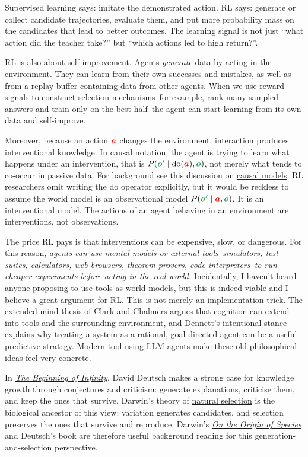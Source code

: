 \documentclass{article}
\newcommand{\colsym}[2]{\ensuremath{\textcolor{#1}{\boldsymbol{#2}}}}
\newcommand{\action}{\colsym{red}{a}}
\newcommand{\obs}{\colsym{ForestGreen}{o}}
\newcommand{\nextobs}{\colsym{ForestGreen}{o'}}
\begin{document}
Supervised learning says: imitate the demonstrated action. RL says: generate or collect candidate trajectories, evaluate them, and put more probability mass on the candidates that lead to better outcomes. 
The learning signal is not just ``what action did the teacher take?'' but ``which actions led to high return?''. 

RL is also about self-improvement. Agents \emph{generate} data by acting in the environment. They can learn from their own successes and mistakes, as well as from a replay buffer containing data from other agents. When we use reward signals to construct selection mechanisms--for example, rank many sampled answers and train only on the best half--the agent can start learning from its own data and self-improve. 

Moreover, because an action \action{} changes the environment, interaction produces interventional knowledge. In causal notation, the agent is trying to learn what happens under an intervention, that is \(P(\nextobs\mid \operatorname{do}(\action),\obs)\), not merely what tends to co-occur in passive data. For background see this discussion on \href{https://en.wikipedia.org/wiki/Causal_model}{causal models}. RL researchers omit writing the do operator explicitly, but it would be reckless to assume the world model is an observational model \(P(\nextobs\mid \action,\obs)\). It is an interventional model. The actions of an agent behaving in an environment are interventions, not observations.

The price RL pays is that interventions can be expensive, slow, or dangerous. For this reason, \emph{agents can use mental models or external tools--simulators, test suites, calculators, web browsers, theorem provers, code interpreters--to run cheaper experiments before acting in the real world.} Incidentally, I haven't heard anyone proposing to use tools as world models, but this is indeed viable and I believe a great argument for RL. This is not merely an implementation trick. The \href{https://en.wikipedia.org/wiki/Extended_mind_thesis}{extended mind thesis} of Clark and Chalmers argues that cognition can extend into tools and the surrounding environment, and Dennett's \href{https://en.wikipedia.org/wiki/The_Intentional_Stance}{intentional stance} explains why treating a system as a rational, goal-directed agent can be a useful predictive strategy. Modern tool-using LLM agents make these old philosophical ideas feel very concrete.

In \href{https://en.wikipedia.org/wiki/The_Beginning_of_Infinity}{\emph{The Beginning of Infinity}}, David Deutsch makes a strong case for knowledge growth through conjectures and criticism: generate explanations, criticise them, and keep the ones that survive. Darwin's theory of \href{https://en.wikipedia.org/wiki/Natural_selection}{natural selection} is the biological ancestor of this view: variation generates candidates, and selection preserves the ones that survive and reproduce. Darwin's \href{https://en.wikipedia.org/wiki/On_the_Origin_of_Species}{\emph{On the Origin of Species}} and Deutsch's book are therefore useful background reading for this generation-and-selection perspective.
\end{document}
